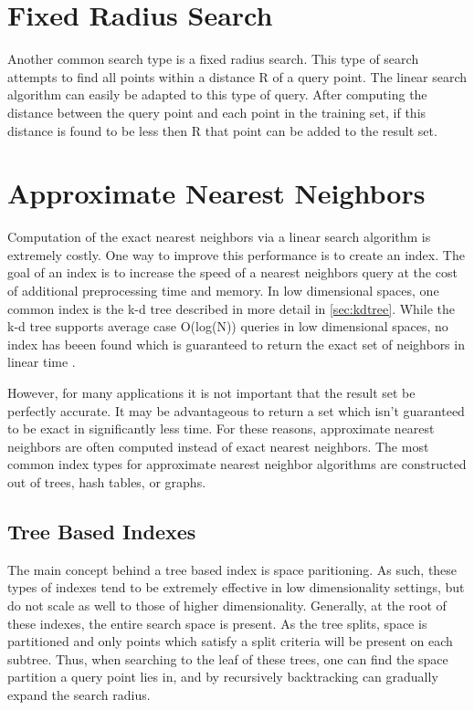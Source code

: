 \section{Fixed Radius Search}

Another common search type is a fixed radius search.  This type of search attempts to find all points within a distance R of a query point.  The linear search algorithm can easily be adapted to this type of query.  After computing the distance between the query point and each point in the training set, if this distance is found to be less then R that point can be added to the result set.

\section{Approximate Nearest Neighbors}
\label{sec:ann}

Computation of the exact nearest neighbors via a linear search algorithm is extremely costly.  One way to improve this performance is to create an index.  The goal of an index is to increase the speed of a nearest neighbors query at the cost of additional preprocessing time and memory.  In low dimensional spaces, one common index is the k-d tree described in more detail in \ref{sec:kdtree}.  While the k-d tree supports average case O(log(N)) queries in low dimensional spaces, no index has beeen found which is guaranteed to return the exact set of neighbors in linear time \citep{muja_flann_2009}.

However, for many applications it is not important that the result set be perfectly accurate.  It may be advantageous to return a set which isn't guaranteed to be exact in significantly less time. For these reasons, approximate nearest neighbors are often computed instead of exact nearest neighbors.  The most common index types for approximate nearest neighbor algorithms are constructed out of trees, hash tables, or graphs.

\subsection{Tree Based Indexes}

The main concept behind a tree based index is space paritioning.  As such, these types of indexes tend to be extremely effective in low dimensionality settings, but do not scale as well to those of higher dimensionality.  Generally, at the root of these indexes, the entire search space is present.  As the tree splits, space is partitioned and only points which satisfy a split criteria will be present on each subtree.  Thus, when searching to the leaf of these trees, one can find the space partition a query point lies in, and by recursively backtracking can gradually expand the search radius.

